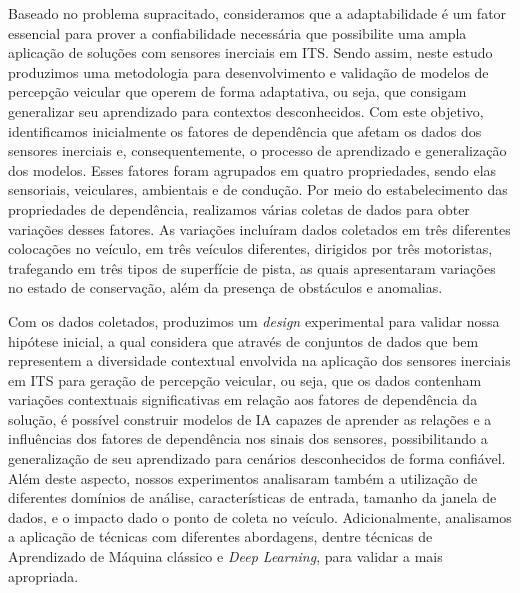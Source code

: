 Baseado no problema supracitado, consideramos que a adaptabilidade é um fator essencial para prover a confiabilidade necessária que possibilite uma ampla aplicação de soluções com sensores inerciais em ITS. Sendo assim, neste estudo produzimos uma metodologia para desenvolvimento e validação de modelos de percepção veicular que operem de forma adaptativa, ou seja, que consigam generalizar seu aprendizado para contextos desconhecidos. Com este objetivo, identificamos inicialmente os fatores de dependência que afetam os dados dos sensores inerciais e, consequentemente, o processo de aprendizado e generalização dos modelos. Esses fatores foram agrupados em quatro propriedades, sendo elas sensoriais, veiculares, ambientais e de condução. Por meio do estabelecimento das propriedades de dependência, realizamos várias coletas de dados para obter variações desses fatores. As variações incluíram dados coletados em três diferentes colocações no veículo, em três veículos diferentes, dirigidos por três motoristas, trafegando em três tipos de superfície de pista, as quais apresentaram variações no estado de conservação, além da presença de obstáculos e anomalias.

Com os dados coletados, produzimos um \textit{design} experimental para validar nossa hipótese inicial, a qual considera que através de conjuntos de dados que bem representem a diversidade contextual envolvida na aplicação dos sensores inerciais em ITS para geração de percepção veicular, ou seja, que os dados contenham variações contextuais significativas em relação aos fatores de dependência da solução, é possível construir modelos de IA capazes de aprender as relações e a influências dos fatores de dependência nos sinais dos sensores, possibilitando a generalização de seu aprendizado para cenários desconhecidos de forma confiável. Além deste aspecto, nossos experimentos analisaram também a utilização de diferentes domínios de análise, características de entrada, tamanho da janela de dados, e o impacto dado o ponto de coleta no veículo. Adicionalmente, analisamos a aplicação de técnicas com diferentes abordagens, dentre técnicas de Aprendizado de Máquina clássico e \textit{Deep Learning}, para validar a mais apropriada.

